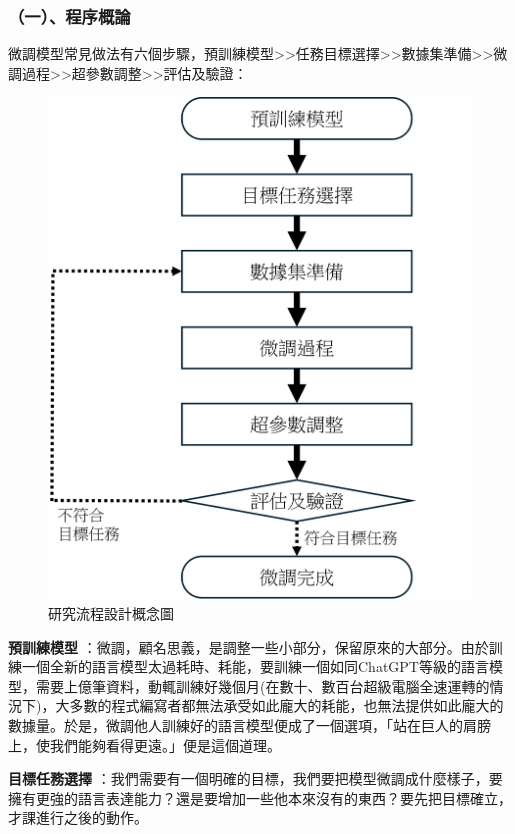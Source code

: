 \documentclass[8pt,a4paper,MingLiU,UTF8]{article}
\def\xeCJKembold{0.4}
\def\saveCJKnode{\dimen255\lastkern}
\def\restoreCJKnode{\kern-\dimen255\kern\dimen255}
\let\CJKoldsymbol\CJKsymbol
\let\CJKoldpunctsymbol\CJKpunctsymbol
\def\CJKfakeboldsymbol#1{%
	\special{pdf:literal direct 2 Tr \xeCJKembold\space w}%
	\CJKoldsymbol{#1}%
	\saveCJKnode
	\special{pdf:literal direct 0 Tr}%
	\restoreCJKnode}
\def\CJKfakeboldpunctsymbol#1{%
	\special{pdf:literal direct 2 Tr \xeCJKembold\space w}%
	\CJKoldpunctsymbol{#1}%
	\saveCJKnode
	\special{pdf:literal direct 0 Tr}%
	\restoreCJKnode}
\newcommand\CJKfakebold[1]{%
	\let\CJKsymbol\CJKfakeboldsymbol
	\let\CJKpunctsymbol\CJKfakeboldpunctsymbol
	#1%
	\let\CJKsymbol\CJKoldsymbol
	\let\CJKpunctsymbol\CJKoldpunctsymbol}
\begin{document}
	\subsubsection{（一）、程序概論}
	微調模型常見做法有六個步驟，預訓練模型>>任務目標選擇>>數據集準備>>微調過程>>超參數調整>>評估及驗證：
	
	\begin{figure}[H]
		\centering
		\includegraphics[scale=0.9]{flowcahrt}
		\caption{研究流程設計概念圖}
	\end{figure}
	
	\CJKfakebold{\textbf{預訓練模型}}：微調，顧名思義，是調整一些小部分，保留原來的大部分。由於訓練一個全新的語言模型太過耗時、耗能，要訓練一個如同ChatGPT等級的語言模型，需要上億筆資料，動輒訓練好幾個月(在數十、數百台超級電腦全速運轉的情況下)，大多數的程式編寫者都無法承受如此龐大的耗能，也無法提供如此龐大的數據量。於是，微調他人訓練好的語言模型便成了一個選項，「站在巨人的肩膀上，使我們能夠看得更遠。」便是這個道理。
	
	\CJKfakebold{\textbf{目標任務選擇}}：我們需要有一個明確的目標，我們要把模型微調成什麼樣子，要擁有更強的語言表達能力？還是要增加一些他本來沒有的東西？要先把目標確立，才課進行之後的動作。
	
\end{document}
